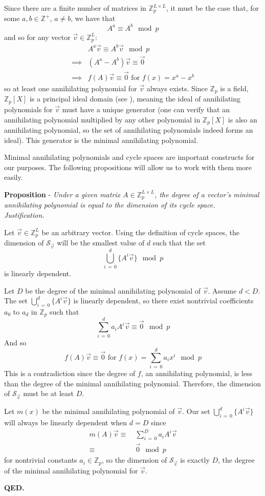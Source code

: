 \documentclass[a4paper, 12pt, reqno]{amsart}
\newcounter{propcounter}
\newenvironment{proposition}[1]
{
	\refstepcounter{propcounter}
	\textbf{Proposition \thepropcounter} - \emph{#1} \\
	\emph{Justification.}
}
{
	\textbf{QED.} \\
}
\begin{document}
		Since there are a finite number of matrices in $\mathds{Z}_p^{L \times L}$, it must be the case that, for some $a, b \in \mathds{Z}^+$, $a \neq b$, we have that
		\[
			A^a \equiv A^b \mod{p}
		\]
		and so for any vector $\vec{v} \in \mathds{Z}_p^L$:
		\begin{align*}
			         & A^a\vec{v} \equiv A^b\vec{v} \mod{p} \\
			\implies & (A^a - A^b)\vec{v} \equiv \vec{0}    \\
			\implies & f(A)\vec{v} \equiv \vec{0} \text{ for } f(x) = x^a - x^b
		\end{align*}
		so at least one annihilating polynomial for $\vec{v}$ always exists. Since $\mathds{Z}_p$ is a field, $\mathds{Z}_p[X]$ is a principal ideal domain (see 
		\citet{enwiki:PID}), meaning the ideal of annihilating polynomials for $\vec{v}$ must have a unique generator (one can verify that an annihilating polynomial 
		multiplied by any other polynomial in $\mathds{Z}_p[X]$ is also an annihilating polynomial, so the set of annihilating polynomials indeed forms an ideal). This 
		generator is the minimal annihilating polynomial.
		
		Minimal annihilating polynomials and cycle spaces are important constructs for our purposes. The following propositions will allow us to work with them more easily.
		
		\begin{proposition}{Under a given matrix $A \in \mathds{Z}_p^{L \times L}$, the degree of a vector's minimal annihilating polynomial is equal to the dimension of 
		its cycle space.}
			\label{prop:degOfS}
			Let $\vec{v} \in \mathds{Z}_p^L$ be an arbitrary vector. Using the definition of cycle spaces, the dimension of $\mathcal{S}_{\vec{v}}$ will be the smallest
			value of $d$ such that the set
			\[
				\bigcup_{i\,=\,0}^d \{A^i\vec{v}\} \mod{p}
			\]
			is linearly dependent.
			
			Let $D$ be the degree of the minimal annihilating polynomial of $\vec{v}$. Assume $d < D$. The set $\bigcup_{i\,=\,0}^d \{A^i\vec{v}\}$ is linearly dependent, 
			so there exist nontrivial coefficients $a_0$ to $a_d$ in $\mathds{Z}_p$ such that
			\[
				\sum_{i\,=\,0}^d a_iA^i\vec{v} \equiv \vec{0} \mod{p}
			\]
			And so
			\[
				f(A)\vec{v} \equiv \vec{0} \text{ for } f(x) = \sum_{i\,=\,0}^d a_ix^i \mod{p}
			\]
			This is a contradiction since the degree of $f$, an annihilating polynomial, is less than the degree of the minimal annihilating polynomial. Therefore, the 
			dimension of $\mathcal{S}_{\vec{v}}$ must be at least $D$. 
			
			Let $m(x)$ be the minimal annihilating polynomial of $\vec{v}$. Our set $\bigcup_{i\,=\,0}^d \{A^i\vec{v}\}$ will always be linearly dependent when $d = D$ since 
			\begin{align*}
				m(A)\vec{v} \equiv& \ \sum_{i\,=\,0}^D a_iA^i\vec{v} \\
				            \equiv& \ \vec{0} \mod{p}
			\end{align*}
			for nontrivial constants $a_i \in \mathds{Z}_p$, so the dimension of $\mathcal{S}_{\vec{v}}$ is exactly $D$, the degree of the minimal annihilating polynomial for
			$\vec{v}$.
		\end{proposition}
		
\end{document}
